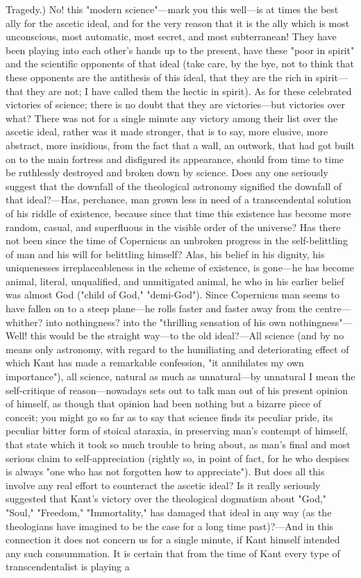 \documentclass[12pt]{article}
\begin{document}
Tragedy.) No! this "modern science"---mark you this well---is at times the best ally for the ascetic ideal, and for the very reason that it is the ally which is most unconscious, most automatic, most secret, and most subterranean! They have been playing into each other's hands up to the present, have these "poor in spirit" and the scientific opponents of that ideal (take care, by the bye, not to think that these opponents are the antithesis of this ideal, that they are the rich in spirit---that they are not; I have called them the hectic in spirit). As for these celebrated victories of science; there is no doubt that they are victories---but victories over what? There was not for a single minute any victory among their list over the ascetic ideal, rather was it made stronger, that is to say, more elusive, more abstract, more insidious, from the fact that a wall, an outwork, that had got built on to the main fortress and disfigured its appearance, should from time to time be ruthlessly destroyed and broken down by science. Does any one seriously suggest that the downfall of the theological astronomy signified the downfall of that ideal?---Has, perchance, man grown less in need of a transcendental solution of his riddle of existence, because since that time this existence has become more random, casual, and superfluous in the visible order of the universe? Has there not been since the time of Copernicus an unbroken progress in the self-belittling of man and his will for belittling himself? Alas, his belief in his dignity, his uniquenesses irreplaceableness in the scheme of existence, is gone---he has become animal, literal, unqualified, and unmitigated animal, he who in his earlier belief was almost God ("child of God," "demi-God"). Since Copernicus man seems to have fallen on to a steep plane---he rolls faster and faster away from the centre---whither? into nothingness? into the "thrilling sensation of his own nothingness"---Well! this would be the straight way---to the old ideal?---All science (and by no means only astronomy, with regard to the humiliating and deteriorating effect of which Kant has made a remarkable confession, "it annihilates my own importance"), all science, natural as much as unnatural---by unnatural I mean the self-critique of reason---nowadays sets out to talk man out of his present opinion of himself, as though that opinion had been nothing but a bizarre piece of conceit; you might go so far as to say that science finds its peculiar pride, its peculiar bitter form of stoical ataraxia, in preserving man's contempt of himself, that state which it took so much trouble to bring about, as man's final and most serious claim to self-appreciation (rightly so, in point of fact, for he who despises is always "one who has not forgotten how to appreciate"). But does all this involve any real effort to counteract the ascetic ideal? Is it really seriously suggested that Kant's victory over the theological dogmatism about "God," "Soul," "Freedom," "Immortality," has damaged that ideal in any way (as the theologians have imagined to be the case for a long time past)?---And in this connection it does not concern us for a single minute, if Kant himself intended any such consummation. It is certain that from the time of Kant every type of transcendentalist is playing a 
\end{document}
